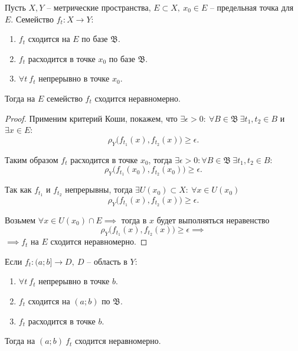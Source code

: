 \begin{corollary}
    Пусть $X,Y$ -- метрические пространства, $E \subset X, \ x_0 \in E$ -- предельная точка для $E$. Семейство $f_t: X \rightarrow Y$:
    \begin{enumerate}
        \item $f_t$ сходится на $E$ по базе $\mathfrak{B}$.
        \item $f_t$ расходится в точке $x_0$ по базе $\mathfrak{B}$.
        \item $\forall t \ f_t$ непрерывно в точке $x_0$.
    \end{enumerate}

    Тогда на $E$ семейство $f_t$ сходится неравномерно.
\end{corollary}

\begin{proof}
    Применим критерий Коши, покажем, что $\exists \epsilon > 0: \ \forall B \in \mathfrak{B} \ \exists t_1, t_2 \in B$ и $\exists x \in E$:
    \[
        \rho_Y\big(f_{t_1}(x), f_{t_2}(x)\big) \geqslant \epsilon.
    \]

    Таким образом $f_t$ расходится в точке $x_0$, тогда $\exists \epsilon > 0: \forall B \in \mathfrak{B} \ \exists t_1,t_2 \in B$:
    \[
        \rho_Y\big(f_{t_1}(x_0), f_{t_2}(x_0)\big) \geqslant \epsilon.
    \]

    Так как $f_{t_1}$ и $f_{t_2}$ непрерывны, тогда $\exists U(x_0)\subset X: \ \forall x \in U(x_0)$
    \[
        \rho_Y\big(f_{t_1}(x), f_{t_2}(x)\big) \geqslant \epsilon.
    \]

    Возьмем $\forall x \in U(x_0) \cap E \implies$ тогда в $x$ будет выполняться неравенство
    \[
        \rho_Y\big(f_{t_1}(x), f_{t_2}(x)\big)\geqslant \epsilon \implies
    \]
    $\implies f_t$ на $E$ сходится неравномерно.
\end{proof}

\begin{corollary}
    Если $f_t:(a;b] \rightarrow D, \ D$ -- область в $Y$:
    \begin{enumerate}
        \item $\forall t \ f_t$ непрерывно в точке $b$.
        \item $f_t$ сходится на $(a;b)$ по $\mathfrak{B}$.
        \item $f_t$ расходится в точке $b$.
    \end{enumerate}

    Тогда на $(a;b) \ f_t$ сходится неравномерно.
\end{corollary}

